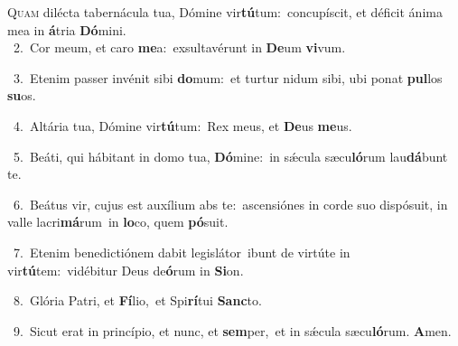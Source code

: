 \lettrine{\initial\textcolor{\initialcolor}{Q}}{uam} dilécta tabernácula tua, Dómine vir\-\textbf{tú}\-tum:~\star concupíscit, et déficit ánima mea in \textbf{á}\-tria \textbf{Dó}\-mini.\\
{\numbfont\textcolor{\numbcolor}{~2.}}~Cor meum, et caro \textbf{me}\-a:~\star exsultavérunt in \textbf{De}\-um \textbf{vi}\-vum.\par
{\numbfont\textcolor{\numbcolor}{~3.}}~Etenim passer invénit sibi \textbf{do}\-mum:~\star et turtur nidum sibi, ubi ponat \textbf{pul}\-los \textbf{su}\-os.\par
{\numbfont\textcolor{\numbcolor}{~4.}}~Altária tua, Dómine vir\-\textbf{tú}\-tum:~\star Rex meus, et \textbf{De}\-us \textbf{me}\-us.\par
{\numbfont\textcolor{\numbcolor}{~5.}}~Beáti, qui hábitant in domo tua, \textbf{Dó}\-mine:~\star in sǽcula sæcu\-\textbf{ló}\-rum lau\-\textbf{dá}\-bunt te.\par
{\numbfont\textcolor{\numbcolor}{~6.}}~Beátus vir, cujus est auxílium abs te:~\dagger ascensiónes in corde suo dispósuit, in valle lacri\-\textbf{má}\-rum~\star in \textbf{lo}\-co, quem \textbf{pó}\-suit.\par
{\numbfont\textcolor{\numbcolor}{~7.}}~Etenim benedictiónem dabit legislátor~\dagger ibunt de virtúte in vir\-\textbf{tú}\-tem:~\star vidébitur Deus de\-\textbf{ó}\-rum in \textbf{Si}\-on.\par
{\numbfont\textcolor{\numbcolor}{~8.}}~Glória Patri, et \textbf{Fí}\-lio,~\star et Spi\-\textbf{rí}\-tui \textbf{Sanc}\-to.\par
{\numbfont\textcolor{\numbcolor}{~9.}}~Sicut erat in princípio, et nunc, et \textbf{sem}\-per,~\star et in sǽcula sæcu\-\textbf{ló}\-rum. \textbf{A}\-men.\par

